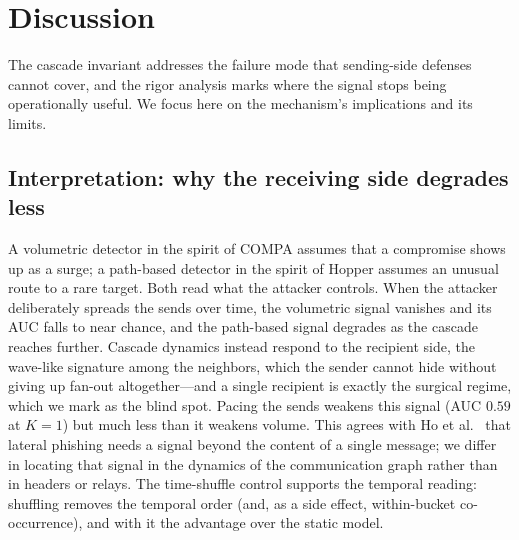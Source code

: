 \section{Discussion}
\label{sec:discussion}

The cascade invariant addresses the failure mode that sending-side defenses cannot cover, and the rigor
analysis marks where the signal stops being operationally useful. We focus here on the mechanism's
implications and its limits.

\subsection{Interpretation: why the receiving side degrades less}
A volumetric detector in the spirit of COMPA \citep{stringhini2015thataint} assumes that a compromise shows up
as a surge; a path-based detector in the spirit of Hopper \citep{ho2021hopper} assumes an unusual route to a
rare target. Both read what the attacker controls. When the attacker deliberately spreads the sends over
time, the volumetric signal vanishes and its AUC falls to near chance, and the path-based signal
degrades as the cascade reaches further. Cascade dynamics instead respond to the recipient side, the
wave-like signature among the neighbors, which the sender cannot hide without giving up fan-out
altogether---and a single recipient is exactly the surgical regime, which we mark as the blind spot. Pacing
the sends weakens this signal (AUC $0.59$ at $K{=}1$) but much less than it weakens volume. This
agrees with Ho et al.\ \citep{ho2019detecting} that lateral phishing needs a signal beyond the content of a
single message; we differ in locating that signal in the dynamics of the communication graph rather than in
headers or relays. The time-shuffle control supports the temporal reading: shuffling removes the temporal
order (and, as a side effect, within-bucket co-occurrence), and with it the advantage over the static model.

